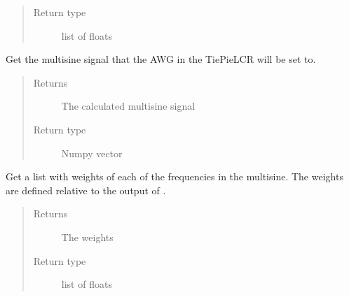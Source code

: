 \documentclass[letterpaper,10pt,english]{sphinxmanual}
\begin{document}
\begin{fulllineitems}
\begin{fulllineitems}
\begin{quote}
\begin{description}
\item[{Return type}] \leavevmode
\sphinxAtStartPar
list of floats

\end{description}\end{quote}

\end{fulllineitems}


\begin{fulllineitems}
\label{\detokenize{index:TiePieLCR_settings.TiePieLCR_settings.get_multisine_vector}}
\sphinxAtStartPar
Get the multisine signal that the AWG in the TiePieLCR will be set to.
\begin{quote}\begin{description}
\item[{Returns}] \leavevmode
\sphinxAtStartPar
The calculated multisine signal

\item[{Return type}] \leavevmode
\sphinxAtStartPar
Numpy vector

\end{description}\end{quote}

\end{fulllineitems}


\begin{fulllineitems}
\label{\detokenize{index:TiePieLCR_settings.TiePieLCR_settings.get_multisine_weights}}
\sphinxAtStartPar
Get a list with weights of each of the frequencies in the multisine. The weights are defined relative to the output of  .
\begin{quote}\begin{description}
\item[{Returns}] \leavevmode
\sphinxAtStartPar
The weights

\item[{Return type}] \leavevmode
\sphinxAtStartPar
list of floats


\end{description}
\end{quote}
\end{fulllineitems}
\end{fulllineitems}
\end{document}
